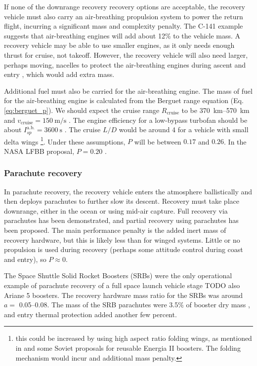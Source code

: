 \documentclass[conf]{new-aiaa}
\begin{document}
If none of the downrange recovery recovery options are acceptable, the recovery vehicle must also carry an air-breathing propulsion system to power the return flight, incurring a significant mass and complexity penalty.
The C-141 example suggests that air-breathing engines will add about 12\% to the vehicle mass. A recovery vehicle may be able to use smaller engines, as it only needs enough thrust for cruise, not takeoff. However, the recovery vehicle will also need larger, perhaps moving, nacelles to protect the air-breathing engines during ascent and entry \cite{Healy1998}, which would add extra mass.

Additional fuel must also be carried for the air-breathing engine. The mass of fuel for the air-breathing engine is calculated from the Berguet range equation (Eq. \ref{eq:berguet_p}). We should expect the cruise range $R_{\mathrm{cruise}}$ to be \SIrange{370}{570}{\kilo\meter} \cite{Healy1998, Hellman2005} and $v_{\mathrm{cruise}} = \SI{150}{\meter\per\second}$ \cite{Healy1998}. The engine efficiency for a low-bypass turbofan should be about $I_{sp}^{\mathrm{a.b.}} = \SI{3600}{\second}$ \cite{Hellman2005}. The cruise $L/D$ would be around 4 for a vehicle with small delta wings \footnote{this could be increased by using high aspect ratio folding wings, as mentioned in \cite{Healy1998} and some Soviet proposals for reusable Energia II boosters. The folding mechanism would incur and additional mass penalty.}. Under these assumptions, $P$ will be between $0.17$ and $0.26$. In the NASA LFBB proposal, $P=0.20$ \cite{Healy1998}.


\subsubsection{Parachute recovery}
In parachute recovery, the recovery vehicle enters the atmosphere ballistically and then deploys parachutes to further slow its descent. Recovery must take place downrange, either in the ocean or using mid-air capture. Full recovery via parachutes has been demonstrated, and partial recovery using parachutes has been proposed. The main performance penalty is the added inert mass of recovery hardware, but this is likely less than for winged systems. Little or no propulsion is used during recovery (perhaps some attitude control during coast and entry), so $P \approx 0$.

The Space Shuttle Solid Rocket Boosters (SRBs) were the only operational example of parachute recovery of a full space launch vehicle stage TODO also Ariane 5 boosters. The recovery hardware mass ratio for the SRBs was around $a=$ \SIrange{0.05}{0.08}{}. The mass of the SRB parachutes were 3.5\% of booster dry mass \cite{Wolf1996}, and entry thermal protection added another few percent.
\end{document}
